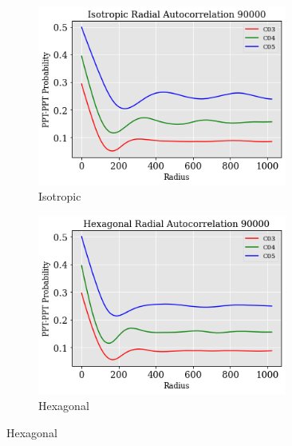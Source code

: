 \documentclass[12pt, a4paper]{report}
\begin{document}
\begin{figure}[H]
\centering
\begin{subfigure}{.45\textwidth}
  \centering
  \includegraphics[width=0.9\textwidth]{Pictures/Comparison/Radial Auto comparison/iso_90k_C345.png}
  \caption{Isotropic}
  \label{img:microstrImg}
\end{subfigure}
\begin{subfigure}{.45\textwidth}
  \centering
  \includegraphics[width=0.9\textwidth]{Pictures/Comparison/Radial Auto comparison/hex_90k_C345.png}
  \caption{Hexagonal}
  \label{img:microstrImg}
\end{subfigure}


\end{figure}
\end{document}
